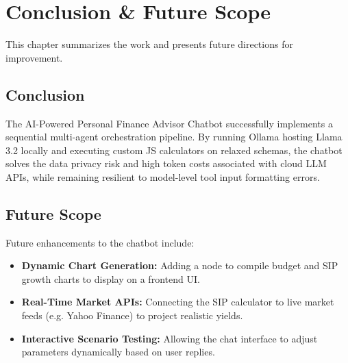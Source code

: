 \documentclass[12pt,a4paper]{report}
\begin{document}
\clearpage
\chapter{Conclusion \& Future Scope}
This chapter summarizes the work and presents future directions for improvement.

\section{Conclusion}
The AI-Powered Personal Finance Advisor Chatbot successfully implements a sequential multi-agent orchestration pipeline. By running Ollama hosting Llama 3.2 locally and executing custom JS calculators on relaxed schemas, the chatbot solves the data privacy risk and high token costs associated with cloud LLM APIs, while remaining resilient to model-level tool input formatting errors.

\section{Future Scope}
Future enhancements to the chatbot include:
\begin{itemize}
    \item \textbf{Dynamic Chart Generation:} Adding a node to compile budget and SIP growth charts to display on a frontend UI.
    \item \textbf{Real-Time Market APIs:} Connecting the SIP calculator to live market feeds (e.g. Yahoo Finance) to project realistic yields.
    \item \textbf{Interactive Scenario Testing:} Allowing the chat interface to adjust parameters dynamically based on user replies.
\end{itemize}
\end{document}
